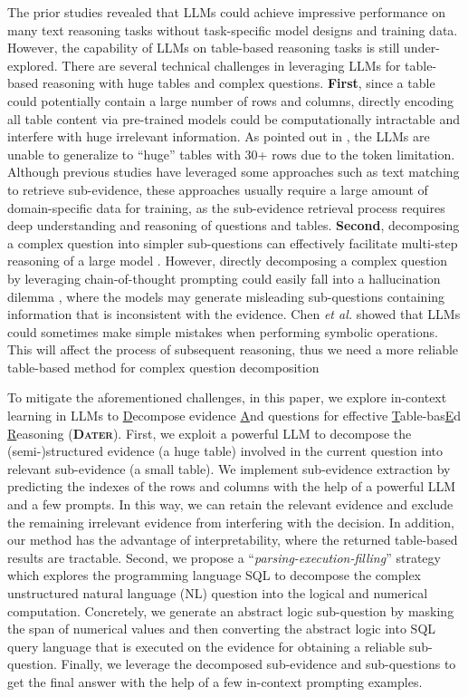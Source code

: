 \documentclass{article}
\begin{document}
The prior studies \citep{cot,zerocot} revealed that LLMs could achieve impressive performance on many text reasoning tasks without task-specific model designs and training data. However, the capability of LLMs on table-based reasoning tasks is still under-explored.  
There are several technical challenges in leveraging LLMs for table-based reasoning with huge tables and complex questions. \textbf{First}, since a table could potentially contain a large number of rows and columns, directly encoding all table content via pre-trained models could be computationally intractable and interfere with huge irrelevant information. As pointed out in \citep{llmtab}, the LLMs are unable to generalize to ``huge'' tables with 30+ rows due to the token limitation. Although previous studies have leveraged some approaches \citep{yin2020tabert,tabfact} such as text matching to retrieve sub-evidence, these approaches usually require a large amount of domain-specific data for training, as the sub-evidence retrieval process requires deep understanding and reasoning of questions and tables. 
\textbf{Second}, decomposing a complex question into simpler sub-questions can effectively facilitate multi-step reasoning of a large model \citep{huang2022language,dua2022successive,pot}. However, directly decomposing a complex question by leveraging chain-of-thought prompting \citep{cot} could easily fall into a hallucination dilemma \citep{ji2022survey}, where the models may generate misleading sub-questions containing information that is inconsistent with the evidence. 
Chen \textit{et al.} \citep{llmtab} showed that LLMs could sometimes make simple mistakes when performing symbolic operations.
This will affect the process of subsequent reasoning, thus we need a more reliable table-based method for complex question decomposition

To mitigate the aforementioned challenges, in this paper, we explore in-context learning in LLMs to \underline{D}ecompose evidence \underline{A}nd questions for effective \underline{T}able-bas\underline{E}d \underline{R}easoning (\textbf{\textsc{Dater}}). 
First, we exploit a powerful LLM to decompose the (semi-)structured evidence (a huge table) involved in the current question into relevant sub-evidence (a small table). We implement sub-evidence extraction by predicting the indexes of the rows and columns with the help of a powerful LLM and a few prompts.
In this way, we can retain the relevant evidence and exclude the remaining irrelevant evidence from interfering with the decision. In addition, our method has the advantage of interpretability, where the returned table-based results are tractable.
Second, we propose a ``\textit{parsing-execution-filling}'' strategy which explores the programming language SQL to decompose the complex unstructured natural language (NL) question into the logical and numerical computation. Concretely, we generate an abstract logic sub-question by masking the span of numerical values and then converting the abstract logic into SQL query language that is executed on the evidence for obtaining a reliable sub-question. Finally, we leverage the decomposed sub-evidence and sub-questions to get the final answer with the help of a few in-context prompting examples.  
\end{document}
